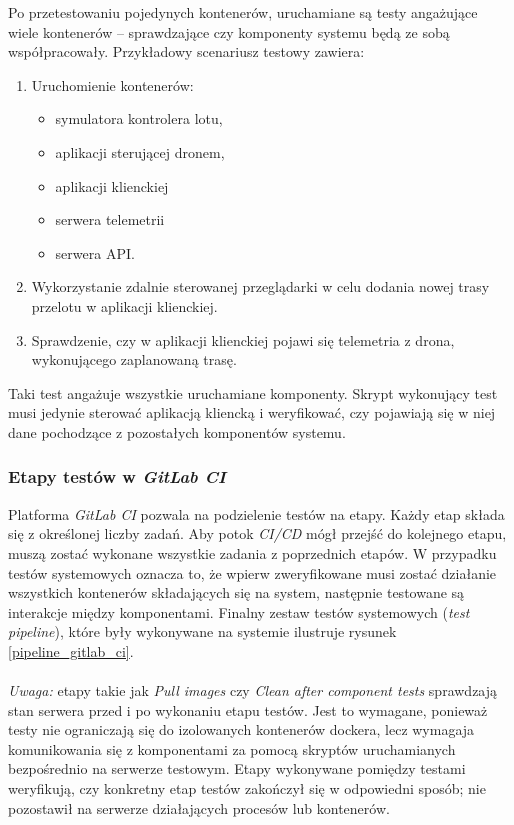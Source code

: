 Po przetestowaniu pojedynych kontenerów, uruchamiane są testy angażujące
wiele kontenerów -- sprawdzające czy komponenty systemu będą ze sobą współpracowały.
Przykładowy scenariusz testowy zawiera:

\begin{enumerate}
    \item Uruchomienie kontenerów:
    \begin{itemize}
        \item symulatora kontrolera lotu,
        \item aplikacji sterującej dronem,
        \item aplikacji klienckiej
        \item serwera telemetrii
        \item serwera API.
    \end{itemize}
    \item Wykorzystanie zdalnie sterowanej przeglądarki w
            celu dodania nowej trasy przelotu w aplikacji klienckiej.
    \item Sprawdzenie, czy w aplikacji klienckiej pojawi się telemetria z drona,
            wykonującego zaplanowaną trasę.
\end{enumerate}

Taki test angażuje wszystkie uruchamiane komponenty. Skrypt wykonujący test
musi jedynie sterować aplikacją kliencką i weryfikować, czy pojawiają się
w niej dane pochodzące z pozostałych komponentów systemu.

\subsubsection{Etapy testów w \textit{GitLab CI}}

Platforma \textit{GitLab CI} pozwala na podzielenie testów na etapy. 
Każdy etap składa się z określonej liczby zadań. Aby potok \textit{CI/CD}
mógł przejść do kolejnego etapu, muszą zostać wykonane wszystkie zadania 
z poprzednich etapów. W przypadku testów systemowych oznacza to, że wpierw
zweryfikowane musi zostać działanie wszystkich kontenerów składających się
na system, następnie testowane są interakcje między komponentami. 
Finalny zestaw testów systemowych (\textit{test pipeline}), które były
wykonywane na systemie ilustruje rysunek \ref{pipeline_gitlab_ci}.\\
\\
\noindent
\textit{Uwaga:} etapy takie jak \textit{Pull images} czy \textit{Clean after component tests}
sprawdzają stan serwera przed i po wykonaniu etapu testów. Jest to wymagane, ponieważ testy
nie ograniczają się do izolowanych kontenerów dockera, lecz wymagaja komunikowania się
z komponentami za pomocą skryptów uruchamianych bezpośrednio na serwerze testowym. 
Etapy wykonywane pomiędzy testami weryfikują, czy konkretny etap testów zakończył 
się w odpowiedni sposób; nie pozostawił na serwerze działających procesów lub kontenerów.

